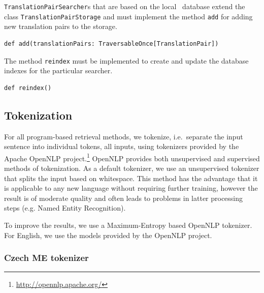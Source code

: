 \vspace*{0.5em}



{\tt TranslationPairSearcher}s that are based on the local \postgres~database extend the class {\tt TranslationPairStorage} and must implement the method {\tt add} for adding new translation pairs to the storage.

\vspace*{0.5em}
 
\begin{lstlisting}
def add(translationPairs: TraversableOnce[TranslationPair])
\end{lstlisting}

\vspace*{0.5em}


The method {\tt reindex} must be implemented to create and update the database indexes for the particular searcher.

\begin{lstlisting}
def reindex()
\end{lstlisting}








\subsection{Tokenization}
\label{sec:tokenization}

For all program-based retrieval methods, we tokenize, i.e.\ separate the input sentence into individual tokens,
all inputs, using tokenizers provided by the Apache OpenNLP project.\footnote{\url{http://opennlp.apache.org/}}
OpenNLP provides both unsupervised and supervised methods of tokenization. 
As a default tokenizer, we use an unsupervised tokenizer that splits the input
based on whitespace. This method has the advantage that it is applicable to any new
language without requiring further training, however the result is of moderate
quality and often leads to problems in latter processing steps (e.g. Named Entity Recognition).

To improve the results, we use a Maximum-Entropy based OpenNLP tokenizer. For English, we use the
models provided by the OpenNLP project. 


\subsubsection*{Czech ME tokenizer}

